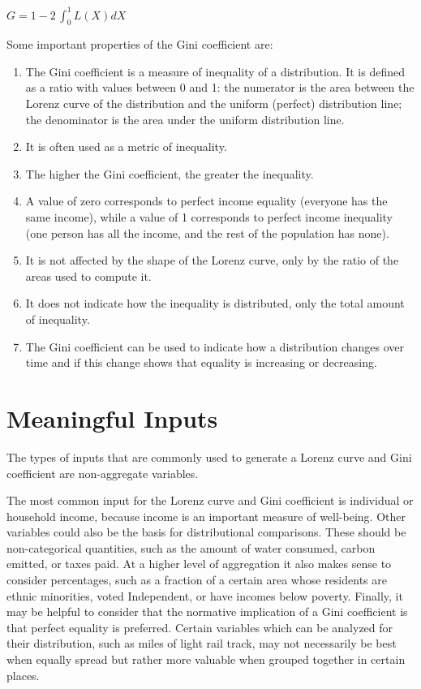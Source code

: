 \documentclass{howto}
\begin{document}
    $G = 1 - 2\,\int_0^1 L(X) dX$ 

Some important properties of the Gini coefficient are:
\begin{enumerate}
\item The Gini coefficient is a measure of inequality of a distribution. It is defined as a ratio with values between 0 and 1: the numerator is the area between the Lorenz curve of the distribution and the uniform (perfect) distribution line; the denominator is the area under the uniform distribution line.
\item It is often used as a metric of inequality.
\item The higher the Gini coefficient, the greater the inequality.
\item A value of zero corresponds to perfect income equality (everyone has the same income), while a value of 1 corresponds to perfect income inequality (one person has all the income, and the rest of the population has none).  
\item It is not affected by the shape of the Lorenz curve, only by the ratio of the areas used to compute it.
\item It does not indicate how the inequality is distributed, only the total amount of inequality. 
\item The Gini coefficient can be used to indicate how a distribution changes over time and if this change shows that equality is increasing or decreasing.
\end{enumerate}

\section{Meaningful Inputs}

The types of inputs that are commonly used to generate a Lorenz curve and 
Gini coefficient are non-aggregate variables. 

The most common input for the Lorenz curve and Gini coefficient is individual or household
income, because income is an important measure of well-being.  Other variables
could also be the basis for distributional comparisons.  These should be
non-categorical quantities, such as the amount of water consumed, carbon emitted, or 
taxes paid.  At a higher level of aggregation it also makes sense to consider
percentages, such as a fraction of a certain area whose residents are ethnic
minorities, voted Independent, or have incomes below poverty.  Finally, it may be
helpful to consider that the normative implication of a Gini coefficient is that perfect 
equality is preferred.  Certain variables which can be analyzed for their distribution, such as miles of light rail track,
may not necessarily be best when equally spread but rather more valuable when
grouped together in certain places.
\end{document}
